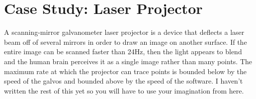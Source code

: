 \section{Case Study: Laser Projector}
A scanning-mirror galvanometer laser projector is a device that deflects a laser beam off of several mirrors in
order to draw an image on another surface. If the entire image can be scanned faster than 24Hz, then the light appears
to blend and the human brain perceives it as a single image rather than many points. The maximum rate at which the
projector can trace points is bounded below by the speed of the galvos and bounded above by the speed of the software.
I haven't written the rest of this yet so you will have to use your imagination from here.
